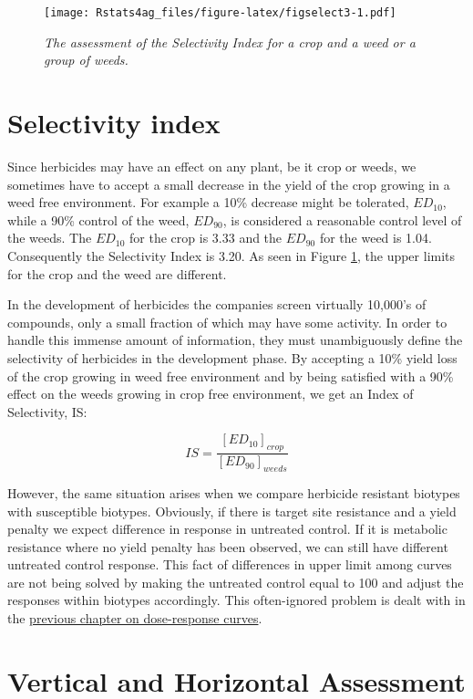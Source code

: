 \documentclass[letterpaper,]{book}
\begin{document}
\begin{figure}
\centering
\texttt{[image: Rstats4ag\_files/figure-latex/figselect3-1.pdf]}
\caption{\label{fig:figselect3}\emph{The assessment of the Selectivity Index for a crop and a weed or a group of weeds.}}
\end{figure}

\hypertarget{selectivity-index}{%
\section{Selectivity index}\label{selectivity-index}}

Since herbicides may have an effect on any plant, be it crop or weeds, we sometimes have to accept a small decrease in the yield of the crop growing in a weed free environment. For example a 10\% decrease might be tolerated, \(ED_{10}\), while a 90\% control of the weed, \(ED_{90}\), is considered a reasonable control level of the weeds. The \(ED_{10}\) for the crop is 3.33 and the \(ED_{90}\) for the weed is 1.04. Consequently the Selectivity Index is 3.20. As seen in Figure \ref{fig:figselect3}, the upper limits for the crop and the weed are different.

In the development of herbicides the companies screen virtually 10,000's of compounds, only a small fraction of which may have some activity. In order to handle this immense amount of information, they must unambiguously define the selectivity of herbicides in the development phase. By accepting a 10\% yield loss of the crop growing in weed free environment and by being satisfied with a 90\% effect on the weeds growing in crop free environment, we get an Index of Selectivity, IS:

\[   IS=\frac{{[ED_{10}]_{crop}}}{{[ED_{90}]_{weeds}}} \]

However, the same situation arises when we compare herbicide resistant biotypes with susceptible biotypes. Obviously, if there is target site resistance and a yield penalty we expect difference in response in untreated control. If it is metabolic resistance where no yield penalty has been observed, we can still have different untreated control response. This fact of differences in upper limit among curves are not being solved by making the untreated control equal to 100 and adjust the responses within biotypes accordingly. This often-ignored problem is dealt with in the \protect\hyperlink{doseresponse1}{previous chapter on dose-response curves}.

\hypertarget{vertical-and-horizontal-assessment}{%
\section{Vertical and Horizontal Assessment}\label{vertical-and-horizontal-assessment}}
\end{document}
